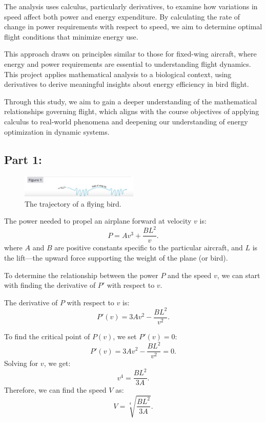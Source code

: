 \documentclass{article}
\begin{document}
The analysis uses calculus, particularly derivatives, to examine how variations in speed affect both power and energy expenditure. By calculating the rate of change in power requirements with respect to speed, we aim to determine optimal flight conditions that minimize energy use.

This approach draws on principles similar to those for fixed-wing aircraft, where energy and power requirements are essential to understanding flight dynamics. This project applies mathematical analysis to a biological context, using derivatives to derive meaningful insights about energy efficiency in bird flight.

Through this study, we aim to gain a deeper understanding of the mathematical relationships governing flight, which aligns with the course objectives of applying calculus to real-world phenomena and deepening our understanding of energy optimization in dynamic systems.


\subsection*{Part 1:}
\begin{figure}[h]
    \centering
    \includegraphics[width=0.5\textwidth]{bird.png}
    \caption{\small The trajectory of a flying bird.}
    \label{fig:bird}
\end{figure}

The power needed to propel an airplane forward at velocity \( v \) is: 
\[
P = Av^3 + \frac{BL^2}{v}.
\]
where \( A \) and \( B \) are positive constants specific to the particular aircraft, and \( L \) is the lift—the upward force supporting the weight of the plane (or bird).
\setlength{\parskip}{2em}

To determine the relationship between the power \(P\) and the speed \(v\), we can start with finding the derivative of \(P'\) with respect to \(v\).

The derivative of \( P \) with respect to \( v \) is:
\[
P'(v) = 3Av^2 - \frac{BL^2}{v^2}.
\]

To find the critical point of \( P(v) \), we set \( P'(v) = 0 \):
\[
P'(v) = 3Av^2 - \frac{BL^2}{v^2} = 0.
\]
Solving for \( v \), we get:
\[
v^4 = \frac{BL^2}{3A}.
\]
Therefore, we can find the speed \( V \) as:
\[
V = \sqrt[4]{\frac{BL^2}{3A}}.
\]
\end{document}
